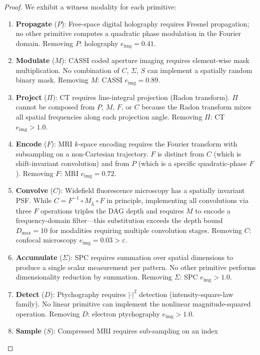 \documentclass[11pt]{article}
\begin{document}
\begin{proof}
We exhibit a witness modality for each primitive:

\begin{enumerate}
  \item \textbf{Propagate} ($P$): Free-space digital holography requires Fresnel propagation;
    no other primitive computes a quadratic phase modulation in the Fourier domain.
    Removing $P$: holography $e_{\mathrm{img}} = 0.41$.
  \item \textbf{Modulate} ($M$): CASSI coded aperture imaging requires
    element-wise mask multiplication. No combination of $C$, $\Sigma$, $S$
    can implement a spatially random binary mask.
    Removing $M$: CASSI $e_{\mathrm{img}} = 0.89$.
  \item \textbf{Project} ($\Pi$): CT requires line-integral projection (Radon transform).
    $\Pi$ cannot be composed from $P$, $M$, $F$, or $C$ because the Radon
    transform mixes all spatial frequencies along each projection angle.
    Removing $\Pi$: CT $e_{\mathrm{img}} > 1.0$.
  \item \textbf{Encode} ($F$): MRI $k$-space encoding requires the Fourier transform
    with subsampling on a non-Cartesian trajectory.
    $F$ is distinct from $C$ (which is shift-invariant convolution)
    and from $P$ (which is a specific quadratic-phase $F$).
    Removing $F$: MRI $e_{\mathrm{img}} = 0.72$.
  \item \textbf{Convolve} ($C$): Widefield fluorescence microscopy has a
    spatially invariant PSF.  While $C = F^{-1} \circ M_{\hat{h}} \circ F$
    in principle, implementing all convolutions via three $F$ operations
    triples the DAG depth and requires $M$ to encode a frequency-domain
    filter---this substitution exceeds the depth bound $D_{\max} = 10$
    for modalities requiring multiple convolution stages.
    Removing $C$: confocal microscopy $e_{\mathrm{img}} = 0.03 > \varepsilon$.
  \item \textbf{Accumulate} ($\Sigma$): SPC requires summation over spatial
    dimensions to produce a single scalar measurement per pattern.
    No other primitive performs dimensionality reduction by summation.
    Removing $\Sigma$: SPC $e_{\mathrm{img}} > 1.0$.
  \item \textbf{Detect} ($D$): Ptychography requires $|{\cdot}|^2$ detection
    (intensity-square-law family).  No linear primitive can implement
    the nonlinear magnitude-squared operation.
    Removing $D$: electron ptychography $e_{\mathrm{img}} > 1.0$.
  \item \textbf{Sample} ($S$): Compressed MRI requires sub-sampling on an index

\end{enumerate}
\end{proof}
\end{document}
